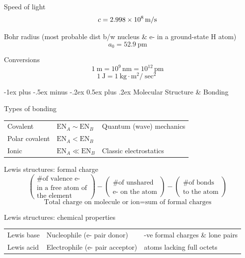 \documentclass[10pt,landscape]{article}
\makeatletter
\renewcommand{\section}{\@startsection{section}{1}{0mm}%
                                {-1ex plus -.5ex minus -.2ex}%
                                {0.5ex plus .2ex}%
                                {\normalfont\large\bfseries}}
\newcommand{\extraline}{\vspace{1em}}
\newcommand{\tableindent}{\hspace{1.5em}}
\makeatother
\begin{document}
\begin{multicols}{3}
Speed of light
\[ c = \SI{2.998E8}{\meter/\second}  \]

Bohr radius {(most probable dist b/w nucleus \& e- in a ground-state H atom)}
\[ a_0 = \SI{52.9}{\pico\metre} \]

Conversions
\[ \SI{1}{\metre} = 10^9 \, \si{\nano\metre} = 10^{12} \, \si{\pico\metre}\]
\[ \SI{1}{\joule} = \SI{1}{\kilogram\cdot\metre^2/\sec^2}  \]


\hrulefill

\section{Molecular Structure \& Bonding}

Types of bonding 

\begin{tabular}{@{\tableindent}llp{26mm}<{\raggedright}@{}}
	Covalent & $\text{EN}_A \sim  \text{EN}_B$ & Quantum (wave) mechanics \\
	Polar covalent & $\text{EN}_A < \text{EN}_B$ & \\
	Ionic & $\text{EN}_A \ll  \text{EN}_B$ &  Classic electrostatics \\
\end{tabular}

Lewis structures: formal charge
\[
\begin{pmatrix}
	 \text{\# of valence e-} \\
	 \text{in a free atom of} \\
	  \text{the element}
\end{pmatrix}
-
\begin{pmatrix}
	\text{\# of unshared} \\
	\text{e- on the atom} 
\end{pmatrix}
-
\begin{pmatrix}
	\text{\# of bonds} \\
	\text{to the atom} 
\end{pmatrix}
\]
\[ \text{Total charge on molecule or ion} = \text{sum of formal charges} \]

\extraline

Lewis structures: chemical properties

\begin{tabular}{@{\tableindent}lp{2.45cm}<{\raggedright}p{2.6cm}<{\raggedright}@{}}
Lewis base & Nucleophile (e- pair donor) & -ve formal charges \& lone pairs \\
Lewis acid & Electrophile (e- pair acceptor) & atoms lacking full octets
\end{tabular}
\extraline


\end{multicols}
\end{document}
